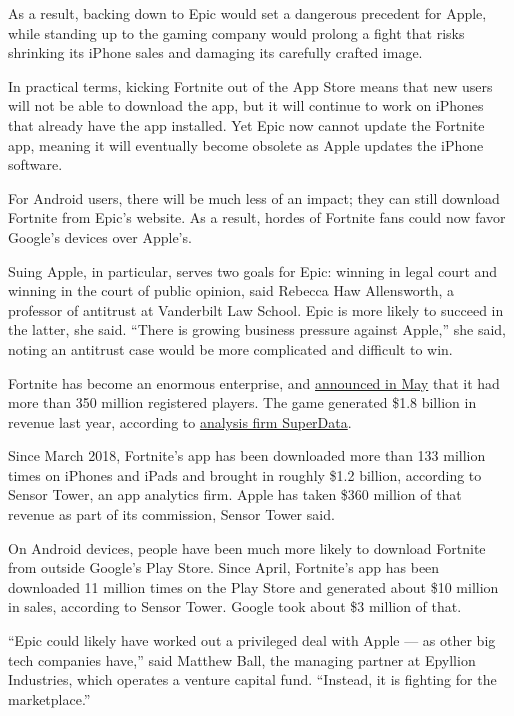 As a result, backing down to Epic would set a dangerous precedent for
Apple, while standing up to the gaming company would prolong a fight
that risks shrinking its iPhone sales and damaging its carefully crafted
image.

In practical terms, kicking Fortnite out of the App Store means that new
users will not be able to download the app, but it will continue to work
on iPhones that already have the app installed. Yet Epic now cannot
update the Fortnite app, meaning it will eventually become obsolete as
Apple updates the iPhone software.

For Android users, there will be much less of an impact; they can still
download Fortnite from Epic's website. As a result, hordes of Fortnite
fans could now favor Google's devices over Apple's.

Suing Apple, in particular, serves two goals for Epic: winning in legal
court and winning in the court of public opinion, said Rebecca Haw
Allensworth, a professor of antitrust at Vanderbilt Law School. Epic is
more likely to succeed in the latter, she said. ``There is growing
business pressure against Apple,'' she said, noting an antitrust case
would be more complicated and difficult to win.

Fortnite has become an enormous enterprise, and
\href{https://twitter.com/FortniteGame/status/1258079550321446912}{announced
in May} that it had more than 350 million registered players. The game
generated \$1.8 billion in revenue last year, according to
\href{https://www.superdataresearch.com/2019-year-in-review}{analysis
firm SuperData}.

Since March 2018, Fortnite's app has been downloaded more than 133
million times on iPhones and iPads and brought in roughly \$1.2 billion,
according to Sensor Tower, an app analytics firm. Apple has taken \$360
million of that revenue as part of its commission, Sensor Tower said.

On Android devices, people have been much more likely to download
Fortnite from outside Google's Play Store. Since April, Fortnite's app
has been downloaded 11 million times on the Play Store and generated
about \$10 million in sales, according to Sensor Tower. Google took
about \$3 million of that.

``Epic could likely have worked out a privileged deal with Apple --- as
other big tech companies have,'' said Matthew Ball, the managing partner
at Epyllion Industries, which operates a venture capital fund.
``Instead, it is fighting for the marketplace.''

